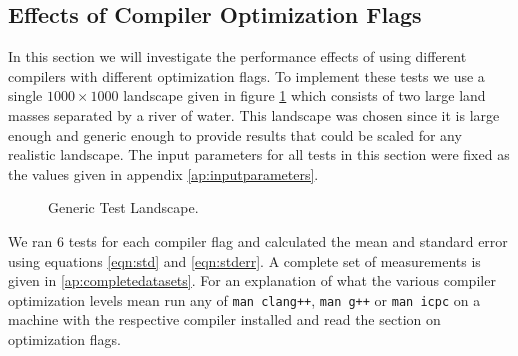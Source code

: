 \subsection{Effects of Compiler Optimization Flags}
\label{subsec:opflags}
In this section we will investigate the performance effects of using different compilers with different optimization flags. To implement these tests we use a single $1000\times1000$ landscape given in figure \ref{fig:optlandscape} which consists of two large land masses separated by a river of water. This landscape was chosen since it is large enough and generic enough to provide results that could be scaled for any realistic landscape. The input parameters for all tests in this section were fixed as the values given in appendix \ref{ap:inputparameters}.
\begin{figure}
\centering
{}
\caption{Generic Test Landscape.}
\label{fig:optlandscape}
\end{figure}

We ran 6 tests for each compiler flag and calculated the mean and standard error using equations \ref{eqn:std} and \ref{eqn:stderr}. A complete set of measurements is given in \ref{ap:completedatasets}. For an explanation of what the various compiler optimization levels mean run any of \texttt{man clang++}, \texttt{man g++} or \texttt{man icpc} on a machine with the respective compiler installed and read the section on optimization flags.

